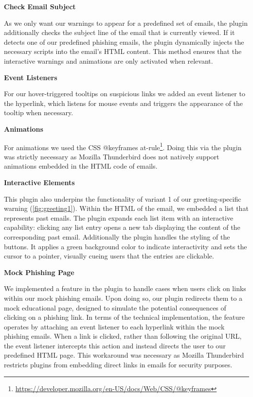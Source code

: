 \documentclass[
  a4paper,  %
  twoside,  %
  bibliography=totoc,
  headsepline,
  cleardoublepage=empty,
  parskip=half,
  draft=false
]{scrbook}
\begin{document}
\textbf{Check Email Subject}

As we only want our warnings to appear for a predefined set of emails, the plugin additionally checks the subject line of the email that is currently viewed. If it detects one of our predefined phishing emails, the plugin dynamically injects the necessary scripts into the email's HTML content. This method ensures that the interactive warnings and animations are only activated when relevant. 

\textbf{Event Listeners}

For our hover-triggered tooltips on suspicious links we added an event listener to the hyperlink, which listens for mouse events and triggers the appearance of the tooltip when necessary. \newpage

\textbf{Animations}

For animations we used the CSS @keyframes at-rule\footnote{ \href{https://developer.mozilla.org/en-US/docs/Web/CSS/@keyframes}{https://developer.mozilla.org/en-US/docs/Web/CSS/@keyframes}}. Doing this via the plugin was strictly necessary as Mozilla Thunderbird does not natively support animations embedded in the HTML code of emails. 

\textbf{Interactive Elements}

This plugin also underpins the functionality of variant 1 of our greeting-specific warning (\ref{fig:greeting1}). Within the HTML of the email, we embedded a list that represents past emails. The plugin expands each list item with an interactive capability: clicking any list entry opens a new tab displaying the content of the corresponding past email. Additionally the plugin handles the styling of the buttons. It applies a green background color to indicate interactivity and sets the cursor to a pointer, visually cueing users that the entries are clickable. 

\textbf{Mock Phishing Page}

We implemented a feature in the plugin to handle cases when users click on links within our mock phishing emails. Upon doing so, our plugin redirects them to a mock educational page, designed to simulate the potential consequences of clicking on a phishing link. In terms of the technical implementation, the feature operates by attaching an event listener to each hyperlink within the mock phishing emails. When a link is clicked, rather than following the original URL, the event listener intercepts this action and instead directs the user to our predefined HTML page. This workaround was necessary as Mozilla Thunderbird restricts plugins from embedding direct links in emails for security purposes.
\end{document}
